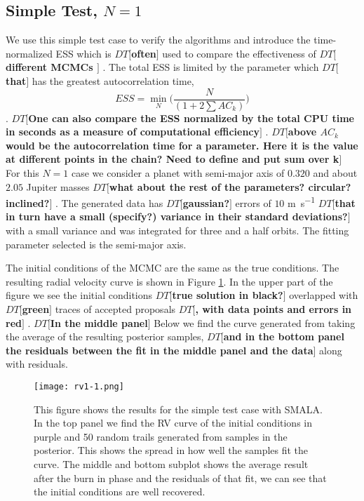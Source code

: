 \documentclass{aa}
\def\memodt#1{\color{green}$DT[${\bf #1}$]$ \color{black}}
\begin{document}
\subsection{Simple Test, $N=1$}
We use this simple test case to verify the algorithms and introduce the time-normalized ESS which is \memodt{often} used to compare the effectiveness of \memodt{different MCMCs \citep[e.g.,][]{Girolami2011, 1504.01418, Meyer2016, Lan2015}}.
The total ESS is limited by the parameter which \memodt{that} has the greatest autocorrelation time, $$ESS = \min_N\bigg( \frac{N}{(1+2\sum AC_k)}\bigg)$$. \memodt{One can also compare the ESS normalized by the total CPU time in seconds as a measure of computational efficiency}. 
\memodt{above $AC_k$ would be the autocorrelation time for a parameter. Here it is the value at different points in the chain? Need to define and put sum over k}
For this $N=1$ case we consider a planet with semi-major axis of $0.320$ and about $2.05$ Jupiter masses \memodt{what about the rest of the parameters? circular? inclined?}.%
The generated data has \memodt{gaussian?} errors of $10$ \si{\metre\per\second} \memodt{that in turn have a small (specify?) variance in their standard deviations?}with a small variance and was integrated for three and a half orbits.
The fitting parameter selected is the semi-major axis.

The initial conditions of the MCMC are the same as the true conditions. 
The resulting radial velocity curve is shown in Figure \ref{FigSimple}. 
In the upper part of the figure we see the initial conditions \memodt{true solution in black?} overlapped with \memodt{green} traces of accepted proposals \memodt{, with data points and errors in red}. 
\memodt{In the middle panel}Below we find the curve generated from taking the average of the resulting posterior samples, \memodt{and in the bottom panel the residuals between the fit in the middle panel and the data}along with residuals.

\begin{figure}
\centering
\texttt{[image: rv1-1.png]}
   \caption{This figure shows the results for the simple test case with SMALA. 
In the top panel we find the RV curve of the initial conditions in purple and 50 random trails generated from samples in the posterior. 
This shows the spread in how well the samples fit the curve. 
The middle and bottom subplot shows the average result after the burn in phase and the residuals of that fit, we can see that the initial conditions are well recovered.}
      \label{FigSimple}
\end{figure}
\end{document}
